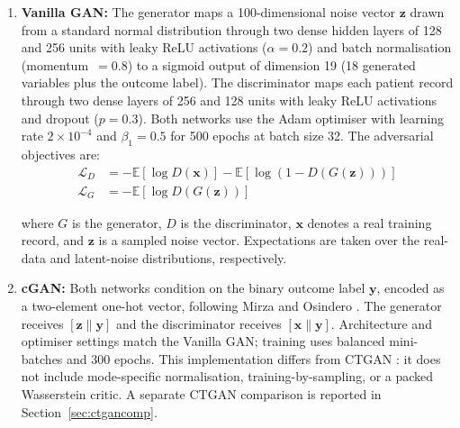 \begingroup
\begin{enumerate}
\revisioncolor
  \item {\textbf {Vanilla GAN:}} The generator maps a 100-dimensional noise vector $\mathbf{z}$ drawn from a standard normal distribution through two dense hidden layers of 128 and 256 units with leaky ReLU activations ($\alpha = 0.2$) and batch normalisation (momentum~$= 0.8$) to a sigmoid output of dimension 19 (18 generated variables plus the outcome label). The discriminator maps each patient record through two dense layers of 256 and 128 units with leaky ReLU activations and dropout ($p = 0.3$). Both networks use the Adam optimiser with learning rate $2 \times 10^{-4}$ and $\beta_1 = 0.5$ for 500 epochs at batch size 32. The adversarial objectives are:
\begin{align}
\mathcal{L}_D &= -\mathbb{E}[\log D(\mathbf{x})] - \mathbb{E}[\log(1 - D(G(\mathbf{z})))] \\
\mathcal{L}_G &= -\mathbb{E}[\log D(G(\mathbf{z}))]
\end{align}

where $G$ is the generator, $D$ is the discriminator, $\mathbf{x}$ denotes a real training record, and $\mathbf{z}$ is a sampled noise vector. Expectations are taken over the real-data and latent-noise distributions, respectively.

\item {\textbf {cGAN:}} Both networks condition on the binary outcome label $\mathbf{y}$, encoded as a two-element one-hot vector, following Mirza and Osindero \cite{mirza2014}. The generator receives $[\mathbf{z}\|\mathbf{y}]$ and the discriminator receives $[\mathbf{x}\|\mathbf{y}]$. Architecture and optimiser settings match the Vanilla GAN; training uses balanced mini-batches and 300 epochs. This implementation differs from CTGAN \cite{xu2019}: it does not include mode-specific normalisation, training-by-sampling, or a packed Wasserstein critic. A separate CTGAN comparison is reported in Section~\ref{sec:ctgancomp}.


\end{enumerate}
